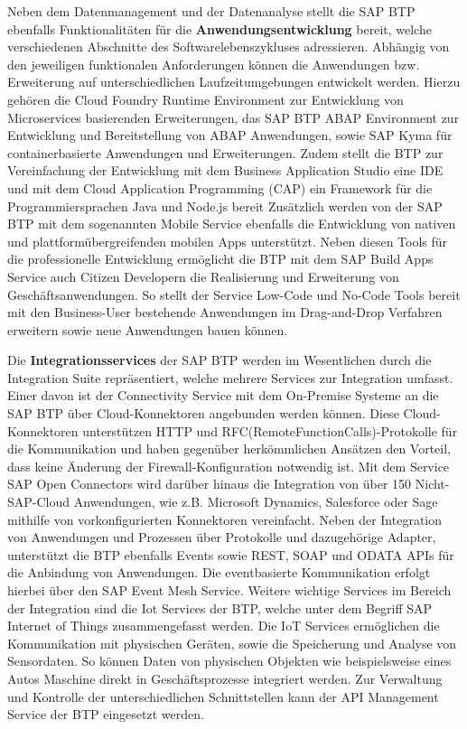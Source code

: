 Neben dem Datenmanagement und der Datenanalyse stellt die SAP BTP ebenfalls Funktionalitäten für die \textbf{Anwendungsentwicklung} bereit, welche verschiedenen Abschnitte des Softwarelebenszykluses adressieren. Abhängig von den jeweiligen funktionalen Anforderungen können die Anwendungen bzw. Erweiterung auf unterschiedlichen Laufzeitumgebungen entwickelt werden. Hierzu gehören die Cloud Foundry Runtime Environment zur Entwicklung von Microservices basierenden Erweiterungen, das SAP BTP ABAP Environment zur Entwicklung und Bereitstellung von ABAP Anwendungen, sowie SAP Kyma für containerbasierte Anwendungen und Erweiterungen. Zudem stellt die BTP zur Vereinfachung der Entwicklung mit dem Business Application Studio eine IDE und mit dem Cloud Application Programming (CAP) ein Framework für die Programmiersprachen Java und Node.js bereit \autocite[Vgl.][S. 67-69]{SEUBERT} Zusätzlich werden von der SAP BTP mit dem sogenannten Mobile Service ebenfalls die Entwicklung von nativen und plattformübergreifenden mobilen Apps unterstützt. \autocite[Vgl.][S. 217-219]{SEUBERT} Neben diesen Tools für die professionelle Entwicklung ermöglicht die BTP mit dem SAP Build Apps Service auch Citizen Developern die Realisierung und Erweiterung von Geschäftsanwendungen. So stellt der Service Low-Code und No-Code Tools bereit mit den Business-User bestehende Anwendungen im Drag-and-Drop Verfahren erweitern sowie neue Anwendungen bauen können. \autocite[Vgl.][S. 4]{SAPBUILDAPPS}

Die \textbf{Integrationsservices} der SAP BTP werden im Wesentlichen durch die Integration Suite repräsentiert, welche mehrere Services zur Integration umfasst. Einer davon ist der Connectivity Service mit dem On-Premise Systeme an die SAP BTP über Cloud-Konnektoren angebunden werden können. \autocite[Vgl.][]{CLOUDCONNECTOR} Diese Cloud-Konnektoren unterstützen HTTP und RFC(RemoteFunctionCalls)-Protokolle für die Kommunikation und haben gegenüber herkömmlichen Ansätzen den Vorteil, dass keine Änderung der Firewall-Konfiguration notwendig ist. Mit dem Service SAP Open Connectors wird darüber hinaus die Integration von über 150 Nicht-SAP-Cloud Anwendungen, wie z.B. Microsoft Dynamics, Salesforce oder Sage mithilfe von vorkonfigurierten Konnektoren vereinfacht. \autocite[Vgl.][S. 28]{INTEGRATIONSUITE2023} Neben der Integration von Anwendungen und Prozessen über Protokolle und dazugehörige Adapter, unterstützt die BTP ebenfalls Events sowie REST, SOAP und ODATA APIs für die Anbindung von Anwendungen. \autocite[Vgl.][]{BTPAPIS2023} Die eventbasierte Kommunikation erfolgt hierbei über den SAP Event Mesh Service.  \autocite[Vgl.][S. 4]{EVENTMESH2022} Weitere wichtige Services im Bereich der Integration sind die Iot Services der BTP, welche unter dem Begriff SAP Internet of Things zusammengefasst werden. \autocite[Vgl.][S. 163]{SEUBERT} Die IoT Services ermöglichen die Kommunikation mit physischen Geräten, sowie die Speicherung und Analyse von Sensordaten. So können Daten von physischen Objekten wie beispielsweise eines Autos Maschine direkt in Geschäftsprozesse integriert werden. \autocite[Vgl.][]{IOTBTP2023}  Zur Verwaltung und Kontrolle der unterschiedlichen Schnittstellen kann der API Management Service der BTP eingesetzt werden. \autocite[Vgl.][S. 72]{SEUBERT} 

